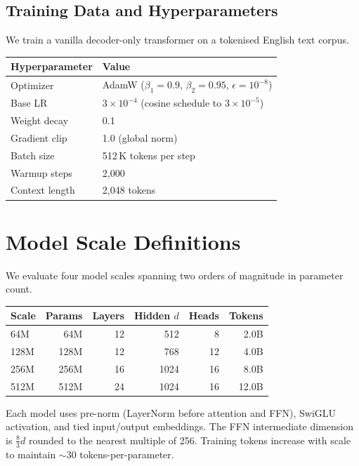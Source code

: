 \subsection{Training Data and Hyperparameters}
We train a vanilla decoder-only transformer on a tokenised English text corpus.
\begin{center}
\begin{tabular}{ll}
\toprule
\textbf{Hyperparameter} & \textbf{Value} \\
\midrule
Optimizer        & AdamW ($\beta_1{=}0.9$, $\beta_2{=}0.95$, $\epsilon{=}10^{-8}$) \\
Base LR          & $3 \times 10^{-4}$ (cosine schedule to $3 \times 10^{-5}$) \\
Weight decay     & 0.1 \\
Gradient clip    & 1.0 (global norm) \\
Batch size       & 512\,K tokens per step \\
Warmup steps     & 2{,}000 \\
Context length   & 2{,}048 tokens \\
\bottomrule
\end{tabular}
\end{center}
\section{Model Scale Definitions}
\label{sec:model_scales}
We evaluate four model scales spanning two orders of magnitude in parameter count.
\begin{center}
\begin{tabular}{lrrrrr}
\toprule
\textbf{Scale} & \textbf{Params} & \textbf{Layers} & \textbf{Hidden $d$} & \textbf{Heads} & \textbf{Tokens} \\
\midrule
64M  & 64M   & 12  & 512  & 8   & 2.0B \\
128M & 128M  & 12  & 768  & 12  & 4.0B \\
256M & 256M  & 16  & 1024 & 16  & 8.0B \\
512M & 512M  & 24  & 1024 & 16  & 12.0B \\
\bottomrule
\end{tabular}
\end{center}
Each model uses pre-norm (LayerNorm before attention and FFN), SwiGLU activation, and tied
input/output embeddings. The FFN intermediate dimension is $\frac{8}{3}d$ rounded to the
nearest multiple of 256. Training tokens increase with scale to maintain $\sim$30
tokens-per-parameter.
